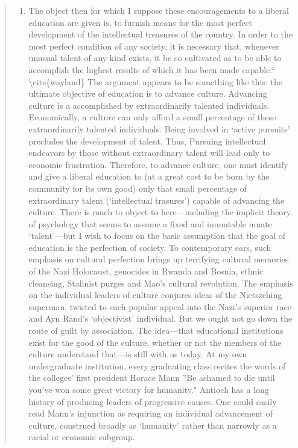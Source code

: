 \begin{quote}
\begin{enumerate}
\item The object then for which I suppose these encouragements to a liberal education are given is, to furnish means for the most perfect development of the intellectual treasures of the country. In order to the most perfect condition of any society, it is necessary that, whenever unusual talent of any kind exists, it be so cultivated as to be able to accomplish the highest results of which it has been made capable.``
\textbackslash{}cite\{wayland\}
The argument appears to be something like this: the ultimate objective of education is to advance culture. Advancing culture is a accomplished by extraordinarily talented individuals. Economically, a culture can only afford a small percentage of these extraordinarily talented individuals. Being involved in `active pursuits' precludes the development of talent. Thus, Pursuing intellectual endeavors by those without extraordinary talent will lead only to economic frustration. Therefore, to advance culture, one must identify and give a liberal education to (at a great cost to be born by the community for its own good) only that small percentage of extraordinary talent (`intellectual trasures') capable of advancing the culture.
There is much to object to here---including the implicit theory of psychology that seems to assume a fixed and immutable innate `talent'---but I wish to focus on the basic assumption that the goal of education is the perfection of society. To contemporary ears, such emphasis on cultural perfection brings up terrifying cultural memories of the Nazi Holocaust, genocides in Rwanda and Bosnia, ethnic cleansing, Stalinist purges and Mao's cultural revolution. The emphasis on the individual leaders of culture conjures ideas of the Nietszching superman, twisted to such popular appeal into the Nazi's superior race and Ayn Rand's `objectivist' individual.
But we ought not go down the route of guilt by association. The idea---that educational institutions exist for the good of the culture, whether or not the members of the culture understand that---is still with us today. At my own undergraduate institution, every graduating class recites the words of the colleges' first president Horace Mann ''Be ashamed to die until you've won some great victory for humanity." Antioch has a long history of producing leaders of progressive causes. One could easily read Mann's injunction as requiring an individual advancement of culture, construed broadly as `humanity' rather than narrowly as a racial or economic subgroup.

\end{enumerate}
\end{quote}

